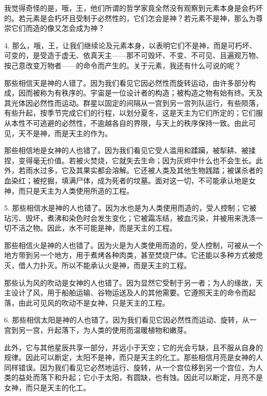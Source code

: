 我觉得奇怪的是，哦，王，他们所谓的哲学家竟全然没有观察到元素本身是会朽坏的。若元素是会朽坏且受制于必然性的，它们怎会是神？若元素不是神，那么为尊崇它们而造的像又怎会成为神？\par

4. 那么，哦，王，让我们继续论及元素本身，以表明它们不是神，而是可朽坏、可变的，是受造于虚无、依真天主——那不可毁坏、不变、不可见、且遍观万物、按己意改变万物者——的命令而产生的。关于元素，我还有什么可说的呢？\par

那些相信天是神的人错了。因为我们看见它因必然性而旋转运动，由许多部分构成，因而被称为有秩序的。宇宙是一位设计者的构造；被构造之物有始有终。天及其光体因必然性而运动。群星以固定的间隔从一宫到另一宫列队运行，有些陨落，有些升起，按季节完成它们的行程，以划分夏冬，这是天主为它们所定的；它们服从本性不可逃避的必然性，不逾越各自的界限，与天上的秩序保持一致。由此可见，天不是神，而是天主的作为。\par

那些相信地是女神的人也错了。因为我们看见它受人滥用和蹂躏，被犁耕、被揉捏，变得毫无价值。若被火焚烧，它就失去生命；因为灰烬中什么也不会生长。此外，若雨水过多，它及其果实都会溶解。它还被人类及其他生物践踏；被谋杀者的血染红；被挖掘，填满尸体，成为死者的坟墓。面对这一切，不可能承认地是女神，而只是天主为人类使用所造的工程。\par

5. 那些相信水是神的人也错了。因为水也是为人类使用而造的，受人控制；它被玷污、毁坏，煮沸和染色时会发生变化；它被霜冻结，被血污染，并被用来洗涤一切不洁之物。因此，水不可能是神，而是天主的工程。\par

那些相信火是神的人也错了。因为火是为人类使用而造的，受人控制，可被从一个地方带到另一个地方，用于煮烤各种肉类，甚至焚烧尸体。它还能以多种方式被熄灭，借人力扑灭。所以不能承认火是神，而是天主的工程。\par

那些认为风的吹动是女神的人也错了。因为显然它受制于另一者；为人的缘故，天主设计了风，用于船舶运输、谷物运送及人的其他需要。它遵照天主的命令而起落，由此可见风的吹动不是女神，只是天主的工程。\par

6. 那些相信太阳是神的人也错了。因为我们看见它因必然性而运动、旋转，从一宫到另一宫，升起落下，为人类的使用而温暖植物和嫩芽。\par

此外，它与其他星辰共享一部分，并远小于天空；它的光会亏缺，且不服从自身的规律。因此可以断定，太阳不是神，而只是天主的化工。那些相信月亮是女神的人同样错误。因为我们看见它必然地运行、旋转，从一个宫位移到另一个宫位，为人类的益处而落下和升起；它小于太阳，有圆缺，也有蚀。因此可以断定，月亮不是女神，而只是天主的化工。\par

